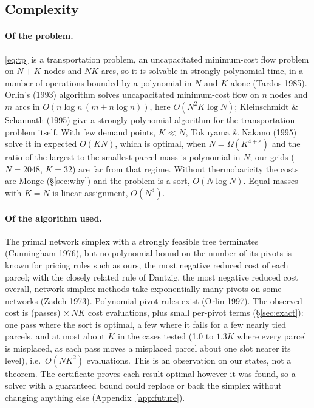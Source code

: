 \documentclass[11pt,a4paper]{article}
\begin{document}
\subsection{Complexity}\label{sec:complexity}
\paragraph{Of the problem.} \eqref{eq:tp} is a transportation problem, an uncapacitated minimum-cost flow problem on
$N+K$ nodes and $NK$ arcs, so it is solvable in strongly polynomial time, in a number of operations bounded by a polynomial
in $N$ and $K$ alone (Tardos 1985). Orlin's (1993) algorithm solves uncapacitated minimum-cost flow on $n$ nodes and $m$ arcs
in $O(n\log n\,(m+n\log n))$, here $O(N^2K\log N)$; Kleinschmidt \& Schannath (1995) give a strongly polynomial algorithm for
the transportation problem itself. With few demand points, $K\ll N$, Tokuyama \& Nakano (1995) solve it in expected
$O(KN)$, which is optimal, when $N=\Omega(K^{4+\varepsilon})$ and the ratio of the largest to the smallest parcel mass is
polynomial in $N$; our grids ($N=2048$, $K=32$) are far from that regime. Without thermobaricity the costs are Monge
(\S\ref{sec:why}) and the problem is a sort, $O(N\log N)$. Equal masses with $K=N$ is linear assignment, $O(N^3)$.

\paragraph{Of the algorithm used.} The primal network simplex with a strongly feasible tree terminates (Cunningham 1976),
but no polynomial bound on the number of its pivots is known for pricing rules such as ours, the most negative reduced cost
of each parcel; with the closely related rule of Dantzig, the most negative reduced cost overall, network simplex methods take
exponentially many pivots on some networks (Zadeh 1973).
Polynomial pivot rules exist (Orlin 1997). The observed cost is (passes)$\,\times NK$ cost evaluations, plus small
per-pivot terms (\S\ref{sec:exact}): one pass where the sort is optimal, a few where it fails for a few nearly tied parcels,
and at most about $K$ in the cases tested (1.0 to $1.3K$ where every parcel is misplaced, as each pass moves a misplaced parcel
about one slot nearer its level), i.e.\ $O(NK^2)$ evaluations. This is an observation on our states, not a theorem. The
certificate proves each result optimal however it was found, so a solver with a guaranteed bound could replace or back the
simplex without changing anything else (Appendix~\ref{app:future}).
\end{document}
